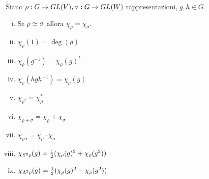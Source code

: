 \begin{proposition}
Siano $\rho:G\to GL(V),\allowbreak\sigma:G\to GL(W)$ rappresentazioni, $g,h\in G$.
\begin{enumerate}[(i)]
\item Se $\rho\simeq\sigma$ allora $\chi_\rho=\chi_\sigma$.
\item $\chi_\rho(1)=\deg(\rho)$
\item $\chi_\rho(g^{-1})=\chi_\rho(g)^*$
\item $\chi_\rho(hgh^{-1})=\chi_\rho(g)$
\item $\chi_{\rho^*}=\chi_\rho^*$
\item $\chi_{\rho+\sigma}=\chi_\rho+\chi_\sigma$
\item $\chi_{\rho\sigma}=\chi_\rho\cdot\chi_\sigma$
\item $\chi_{S^2\rho}(g)=\frac{1}{2}(\chi_\rho(g)^2+\chi_\rho(g^2))$
\item $\chi_{\Lambda^2\rho}(g)=\frac{1}{2}(\chi_\rho(g)^2-\chi_\rho(g^2))$
\end{enumerate}
\end{proposition}
